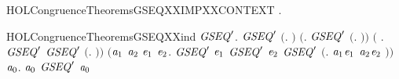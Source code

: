 \newcommand{\HOLCongruenceTheoremsGSEQXXcombin}{\UseVerbatim{HOLCongruenceTheoremsGSEQXXcombin}}
\begin{SaveVerbatim}{HOLCongruenceTheoremsGSEQXXIMPXXCONTEXT}
\HOLTokenTurnstile{} \HOLSymConst{\HOLTokenForall{}}.   \HOLSymConst{\HOLTokenImp{}}  
\end{SaveVerbatim}
\newcommand{\HOLCongruenceTheoremsGSEQXXIMPXXCONTEXT}{\UseVerbatim{HOLCongruenceTheoremsGSEQXXIMPXXCONTEXT}}
\begin{SaveVerbatim}{HOLCongruenceTheoremsGSEQXXind}
\HOLTokenTurnstile{} \HOLSymConst{\HOLTokenForall{}}\ensuremath{\HOLBoundVar{GSEQ}\sp{\prime}}.
       \ensuremath{\HOLBoundVar{GSEQ}\sp{\prime}} \ensuremath{(}\HOLTokenLambda{}. \ensuremath{)} \HOLSymConst{\HOLTokenConj{}} \ensuremath{(}\HOLSymConst{\HOLTokenForall{}}. \ensuremath{\HOLBoundVar{GSEQ}\sp{\prime}} \ensuremath{(}\HOLTokenLambda{}. \ensuremath{)}\ensuremath{)} \HOLSymConst{\HOLTokenConj{}}
       \ensuremath{(}\HOLSymConst{\HOLTokenForall{}} . \ensuremath{\HOLBoundVar{GSEQ}\sp{\prime}}  \HOLSymConst{\HOLTokenImp{}} \ensuremath{\HOLBoundVar{GSEQ}\sp{\prime}} \ensuremath{(}\HOLTokenLambda{}. \HOLSymConst{\ensuremath{\ldotp}} \ensuremath{)}\ensuremath{)} \HOLSymConst{\HOLTokenConj{}}
       \ensuremath{(}\HOLSymConst{\HOLTokenForall{}}\ensuremath{\HOLBoundVar{a}\sb{\mathrm{1}}} \ensuremath{\HOLBoundVar{a}\sb{\mathrm{2}}} \ensuremath{\HOLBoundVar{e}\sb{\mathrm{1}}} \ensuremath{\HOLBoundVar{e}\sb{\mathrm{2}}}.
            \ensuremath{\HOLBoundVar{GSEQ}\sp{\prime}} \ensuremath{\HOLBoundVar{e}\sb{\mathrm{1}}} \HOLSymConst{\HOLTokenConj{}} \ensuremath{\HOLBoundVar{GSEQ}\sp{\prime}} \ensuremath{\HOLBoundVar{e}\sb{\mathrm{2}}} \HOLSymConst{\HOLTokenImp{}} \ensuremath{\HOLBoundVar{GSEQ}\sp{\prime}} \ensuremath{(}\HOLTokenLambda{}. \ensuremath{\HOLBoundVar{a}\sb{\mathrm{1}}}\HOLSymConst{\ensuremath{\ldotp}}\ensuremath{\HOLBoundVar{e}\sb{\mathrm{1}}}  \HOLSymConst{\ensuremath{+}} \ensuremath{\HOLBoundVar{a}\sb{\mathrm{2}}}\HOLSymConst{\ensuremath{\ldotp}}\ensuremath{\HOLBoundVar{e}\sb{\mathrm{2}}} \ensuremath{)}\ensuremath{)} \HOLSymConst{\HOLTokenImp{}}
       \HOLSymConst{\HOLTokenForall{}}\ensuremath{\HOLBoundVar{a}\sb{\mathrm{0}}}.  \ensuremath{\HOLBoundVar{a}\sb{\mathrm{0}}} \HOLSymConst{\HOLTokenImp{}} \ensuremath{\HOLBoundVar{GSEQ}\sp{\prime}} \ensuremath{\HOLBoundVar{a}\sb{\mathrm{0}}}
\end{SaveVerbatim}
